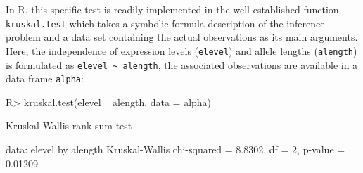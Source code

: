 \documentclass{article}
\newcommand{\Robject}[1]{\texttt{#1}}
\newcommand{\Rcmd}[1]{\texttt{#1}}
\newcommand{\RR}{\textsf{R}}
\newenvironment{Schunk}{}{}
\begin{document}
In \RR{}, this specific test is readily implemented in the well established
function \Rcmd{kruskal.test} which takes a symbolic formula description of the
inference problem and a data set containing the actual observations as its main
arguments. Here, the independence of expression
levels (\Robject{elevel}) and allele lengths (\Robject{alength}) is   
formulated as \verb|elevel ~ alength|, the associated observations are available
in a data frame \Rcmd{alpha}:
\begin{Schunk}
\begin{Sinput}
R> kruskal.test(elevel ~ alength, data = alpha)
\end{Sinput}
\begin{Soutput}
	Kruskal-Wallis rank sum test

data:  elevel by alength 
Kruskal-Wallis chi-squared = 8.8302, df = 2, p-value = 0.01209
\end{Soutput}
\end{Schunk}
\end{document}
